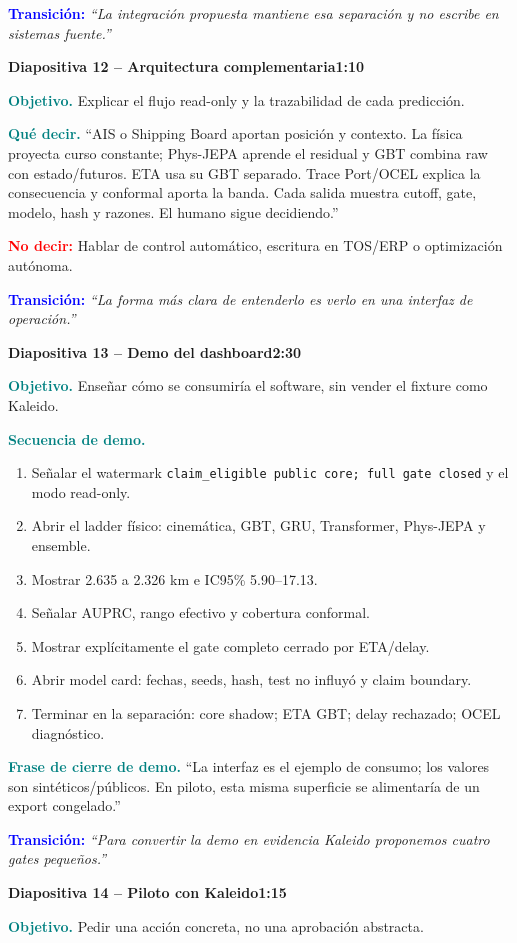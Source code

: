 \documentclass[11pt,a4paper]{article}
\newcommand{\claim}{\texttt{claim\_eligible public core; full gate closed}}
\newcommand{\slidehead}[3]{%
  \par\vspace{7pt}\noindent
  \colorbox{Ink}{\parbox{\dimexpr\linewidth-2\fboxsep\relax}{%
    \color{white}\textbf{Diapositiva #1 -- #2}\hfill\color{Teal!45}\textbf{#3}}}%
  \par\vspace{5pt}}
\newcommand{\cue}[1]{\textcolor{Teal}{\textbf{#1}}}
\newcommand{\avoid}[1]{\textcolor{Red}{\textbf{No decir:}} #1}
\newcommand{\transition}[1]{\textcolor{Blue}{\textbf{Transición:}} \emph{``#1''}}
\begin{document}
\transition{La integración propuesta mantiene esa separación y no escribe en sistemas fuente.}

\slidehead{12}{Arquitectura complementaria}{1:10}
\cue{Objetivo.} Explicar el flujo read-only y la trazabilidad de cada predicción.

\cue{Qué decir.} ``AIS o Shipping Board aportan posición y contexto. La física proyecta
curso constante; Phys-JEPA aprende el residual y GBT combina raw con estado/futuros. ETA
usa su GBT separado. Trace Port/OCEL explica la consecuencia y conformal aporta la banda.
Cada salida muestra cutoff, gate, modelo, hash y razones. El humano sigue decidiendo.''

\avoid{Hablar de control automático, escritura en TOS/ERP o optimización autónoma.}

\transition{La forma más clara de entenderlo es verlo en una interfaz de operación.}

\clearpage
\slidehead{13}{Demo del dashboard}{2:30}
\cue{Objetivo.} Enseñar cómo se consumiría el software, sin vender el fixture como Kaleido.

\cue{Secuencia de demo.}
\begin{enumerate}[leftmargin=6mm,itemsep=2pt]
\item Señalar el watermark \claim{} y el modo read-only.
\item Abrir el ladder físico: cinemática, GBT, GRU, Transformer, Phys-JEPA y ensemble.
\item Mostrar 2.635 a 2.326 km e IC95\% 5.90--17.13.
\item Señalar AUPRC, rango efectivo y cobertura conformal.
\item Mostrar explícitamente el gate completo cerrado por ETA/delay.
\item Abrir model card: fechas, seeds, hash, test no influyó y claim boundary.
\item Terminar en la separación: core shadow; ETA GBT; delay rechazado; OCEL diagnóstico.
\end{enumerate}

\cue{Frase de cierre de demo.} ``La interfaz es el ejemplo de consumo; los valores son
sintéticos/públicos. En piloto, esta misma superficie se alimentaría de un export congelado.''

\transition{Para convertir la demo en evidencia Kaleido proponemos cuatro gates pequeños.}

\slidehead{14}{Piloto con Kaleido}{1:15}
\cue{Objetivo.} Pedir una acción concreta, no una aprobación abstracta.
\end{document}
